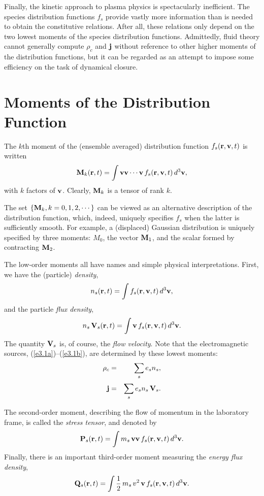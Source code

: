 Finally, the kinetic approach to plasma physics is spectacularly
inefficient. The species distribution functions $f_s$ provide vastly more
information than is needed to obtain the constitutive relations.
After all, these relations only depend on the two lowest moments
of the species distribution functions. Admittedly, fluid theory cannot
generally compute $\rho_c$ and ${\bf j}$ without  reference to other
higher moments of the distribution functions, but it can be regarded as
an attempt to impose some efficiency on the task of dynamical closure. 

\section{Moments of the Distribution Function}
The $k$th moment of the (ensemble averaged) distribution function
$f_s({\bf r}, {\bf v}, t)$ is written
\begin{equation}
{\bf M}_k({\bf r}, t) = \int {\bf v v\cdots v}\,f_s({\bf r},{\bf v}, t)\,d^3{\bf v},
\end{equation}
with $k$ factors of ${\bf v}$. Clearly, ${\bf M}_k$ is a tensor of rank $k$.

The set $\{{\bf M}_k, k=0,1,2,\cdots\}$
can be viewed as an alternative description of the distribution function, which,
indeed, uniquely specifies $f_s$ when the latter is sufficiently smooth. For example,
a (displaced) Gaussian distribution is uniquely specified by three
moments: $M_0$, the vector ${\bf M}_1$, and the scalar formed by contracting
${\bf M}_2$. 

The low-order moments all have names and simple physical interpretations.
First, we have the (particle) {\em density},
\begin{equation}
n_s({\bf r},t) = \int f_s({\bf r}, {\bf v},t)\,d^3{\bf v},
\end{equation}
and the particle {\em flux density}, 
\begin{equation}
n_s\,{\bf V}_s({\bf r}, t) = \int 
{\bf v}\,f_s({\bf r}, {\bf v},t)\,d^3{\bf v}.
\end{equation}
The quantity ${\bf V}_s$ is, of course, the {\em flow velocity}. Note that
the electromagnetic sources, (\ref{e3.1a})--(\ref{e3.1b}), are determined by these lowest
moments:
\begin{eqnarray}
\rho_c &=& \sum_s e_s n_s,\\[0.5ex]
{\bf j} &=& \sum_s e_s n_s\,{\bf V}_s.
\end{eqnarray}

The second-order moment, describing the flow of momentum in the
laboratory frame, is called the {\em stress tensor}, and denoted by
\begin{equation}
{\bf P}_s({\bf r}, t) =  \int
m_s\,{\bf v}{\bf v}\, f_s({\bf r}, {\bf v},t)\,d^3{\bf v}.
\end{equation}
Finally, there is an important third-order moment
measuring the {\em energy flux density},
\begin{equation}
{\bf Q}_s({\bf r}, t) =  \int
\frac{1}{2}\,m_s\,v^2\,{\bf v}\, f_s({\bf r}, {\bf v},t)\,d^3{\bf v}.
\end{equation}


